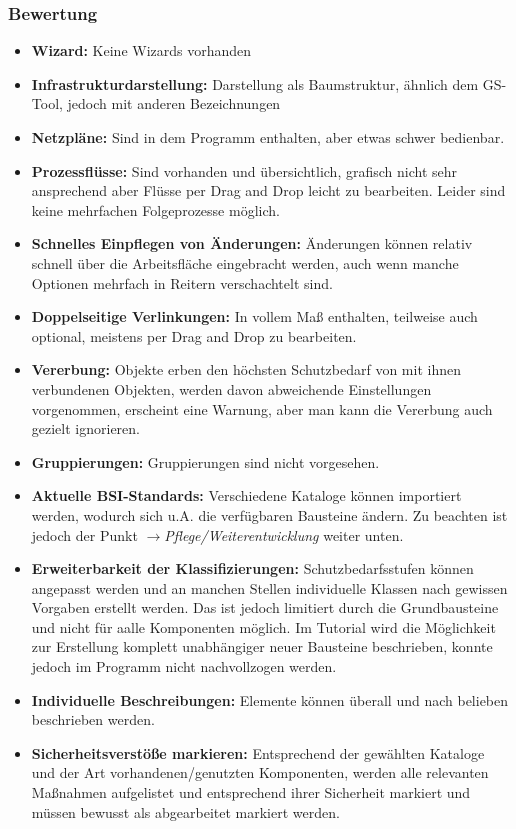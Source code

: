 \subsubsection{Bewertung}
\begin{itemize}
\item \textbf{Wizard:} Keine Wizards vorhanden
\item \textbf{Infrastrukturdarstellung:} Darstellung als Baumstruktur, ähnlich dem GS-Tool, jedoch mit anderen Bezeichnungen
\item \textbf{Netzpläne:} Sind in dem Programm enthalten, aber etwas schwer bedienbar.
\item \textbf{Prozessflüsse:} Sind vorhanden und übersichtlich, grafisch nicht sehr ansprechend aber Flüsse per Drag and Drop leicht zu bearbeiten. Leider sind keine mehrfachen Folgeprozesse möglich.
\item \textbf{Schnelles Einpflegen von Änderungen: } Änderungen können relativ schnell über die Arbeitsfläche eingebracht werden, auch wenn manche Optionen mehrfach in Reitern verschachtelt sind.
\item \textbf{Doppelseitige Verlinkungen:} In vollem Maß enthalten, teilweise auch optional, meistens per Drag and Drop zu bearbeiten.
\item \textbf{Vererbung:} Objekte erben den höchsten Schutzbedarf von mit ihnen verbundenen Objekten, werden davon abweichende Einstellungen vorgenommen, erscheint eine Warnung, aber man kann die Vererbung auch gezielt ignorieren.
\item \textbf{Gruppierungen:} Gruppierungen sind nicht vorgesehen.
\item \textbf{Aktuelle BSI-Standards:} Verschiedene Kataloge können importiert werden, wodurch sich u.A. die verfügbaren Bausteine ändern. Zu beachten ist jedoch der Punkt $\rightarrow$\textit{Pflege/Weiterentwicklung} weiter unten.
\item \textbf{Erweiterbarkeit der Klassifizierungen:} Schutzbedarfsstufen können angepasst werden und an manchen Stellen individuelle Klassen nach gewissen Vorgaben erstellt werden. Das ist jedoch limitiert durch die Grundbausteine und nicht für aalle Komponenten möglich. Im Tutorial wird die Möglichkeit zur Erstellung komplett unabhängiger neuer Bausteine beschrieben, konnte jedoch im Programm nicht nachvollzogen werden.
\item \textbf{Individuelle Beschreibungen:} Elemente können überall und nach belieben beschrieben werden.
\item \textbf{Sicherheitsverstöße markieren:} Entsprechend der gewählten Kataloge und der Art vorhandenen/genutzten Komponenten, werden alle relevanten Maßnahmen aufgelistet und entsprechend ihrer Sicherheit markiert und müssen bewusst als abgearbeitet markiert werden.

\end{itemize}
